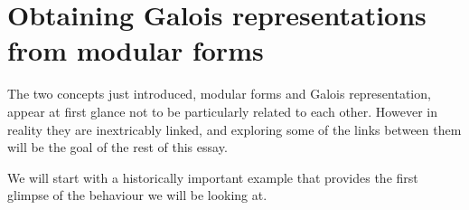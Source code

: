 \documentclass[a4paper,12pt]{article}
\begin{document}


\section{Obtaining Galois representations from modular forms}
The two concepts just introduced, modular forms and Galois representation, appear at first glance not to be particularly related to each other.
However in reality they are inextricably linked, and exploring some of the links between them will be the goal of the rest of this essay.

We will start with a historically important example that provides the first glimpse of the behaviour we will be looking at.
\end{document}
